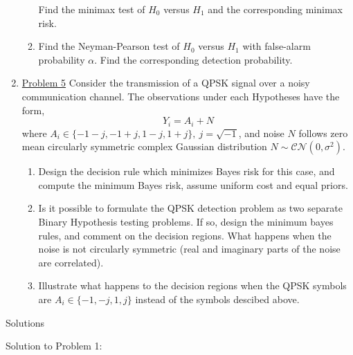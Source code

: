 \documentclass[a4paper,english,10pt]{article}
\begin{document}
\begin{enumerate}
\begin{enumerate}
Find the minimax test of $H_0$ versus $H_1$ and the corresponding minimax risk.
\item Find the Neyman-Pearson test of $H_0$ versus $H_1$ with false-alarm probability $\alpha$. Find the corresponding detection probability.
\end{enumerate}
\item  \hyperlink{solution5}{Problem 5}
Consider the transmission of a QPSK signal over a noisy communication channel. The observations under each Hypotheses have the form,
\begin{equation*}
Y_i=A_i+N	
\end{equation*}
where $A_i\in \{-1-j,-1+j,1-j,1+j\},~j=\sqrt{-1}$, and noise $N$ follows zero mean circularly symmetric complex Gaussian distribution $N\sim\mathcal{CN}(0,\sigma^2)$. 
\begin{enumerate}[label=(\alph{*}).]
\item Design the decision rule which minimizes Bayes risk for this case, and compute the minimum Bayes risk, assume uniform cost and equal priors. 
\item Is it possible to formulate the QPSK detection problem as two separate Binary Hypothesis testing problems. If so, design the minimum bayes rules, and comment on the decision regions. What happens when the noise is not circularly symmetric (real and imaginary parts of the noise are correlated).
\item Illustrate what happens to the decision regions when the QPSK symbols are $A_i\in\{-1,-j,1,j\}$ instead of the symbols descibed  above. 
\end{enumerate}
\end{enumerate}
\newpage
\par{\centering\Large {Solutions}\par}
\hypertarget{solution1}{ Solution to Problem 1:}\\
\end{document}
